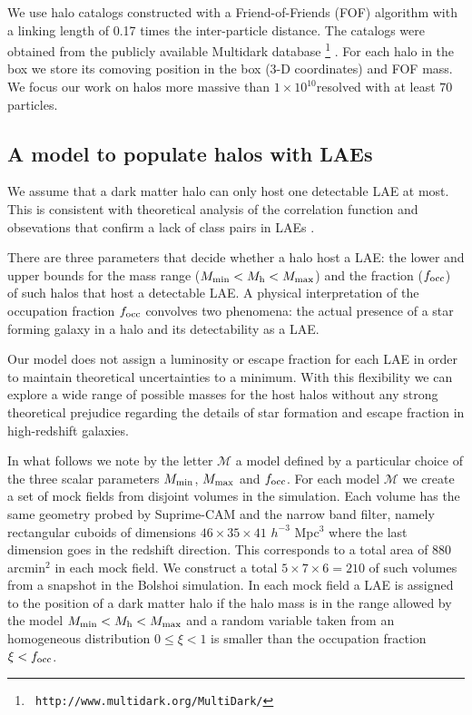 \documentclass{emulateapj}
\newcommand{\ly}{{\ifmmode{{\rm Ly}\alpha}\else{Ly$\alpha$~}\fi}}
\newcommand{\hMsun}{{\ifmmode{h^{-1}{\rm
        {M_{\odot}}}}\else{$h^{-1}{\rm{M_{\odot}}}$}\fi}}
\begin{document}
We use halo catalogs constructed with a Friend-of-Friends (FOF)
algorithm with a linking length of 0.17 times the inter-particle
distance. The catalogs were obtained from the publicly available
Multidark database \footnote{{\tt
    http://www.multidark.org/MultiDark/}} \citep{MultiDark}. For each
halo in the box we store its comoving position in the box (3-D
coordinates) and FOF mass. We focus our work on halos more massive
than $1\times 10^{10}$\hMsun resolved with at least $70$ particles.


\subsection{A model to populate halos with LAEs}
\label{subsec:mocks}


We assume that a dark matter halo can only host one
detectable LAE at most.  This is consistent with theoretical analysis
of the correlation function \citep{Jose2013b} and obsevations that
confirm a lack of class pairs in LAEs \cite{Bond2009}.

There are three parameters that decide whether a halo host a LAE: the
lower and upper bounds for the mass range ($M_{\rm min}< M_{\rm h} < M_{\rm max}$) 
and the fraction ($f_{\rm occ}$) of such halos that host a detectable
LAE. A physical interpretation of the occupation fraction $f_{\rm
  occ}$ convolves two phenomena: the actual presence of a star forming
galaxy in a halo and its detectability as a LAE.  


Our model does not assign a luminosity or escape fraction for each
LAE in order to maintain theoretical uncertainties to a minimum. With
this flexibility we can explore a wide range of possible masses for
the host halos without any strong theoretical prejudice regarding the
details of star formation and \ly escape fraction in high-redshift
galaxies.  


In what follows we note by the letter ${\mathcal M}$ a model
defined by a particular choice of the three scalar parameters $M_{\rm
  min}$, $M_{\rm  max}$ and $f_{\rm occ}$. For each model ${\mathcal
  M}$ we create a set of mock fields from disjoint volumes in the
simulation. Each volume has the same geometry probed by Suprime-CAM
and the narrow band filter, namely rectangular cuboids of dimensions
$46\times 35\times 41$ $h^{-3}$ Mpc$^{3}$ where the last dimension goes
in the redshift direction. This corresponds to a total area of $880$
arcmin$^{2}$ in each mock field. We construct a total $5\times 7
\times 6=210$ of such volumes from a snapshot in the Bolshoi
simulation. In each mock field a LAE is assigned to the position of a
dark matter halo if the halo mass is in the range allowed by the model
$M_{\rm min}<M_{\rm h}<M_{\rm max}$ and a random variable taken from
an homogeneous distribution $0\leq \xi<1$ is smaller than the occupation
fraction $\xi<f_{\rm occ}$.
\end{document}
